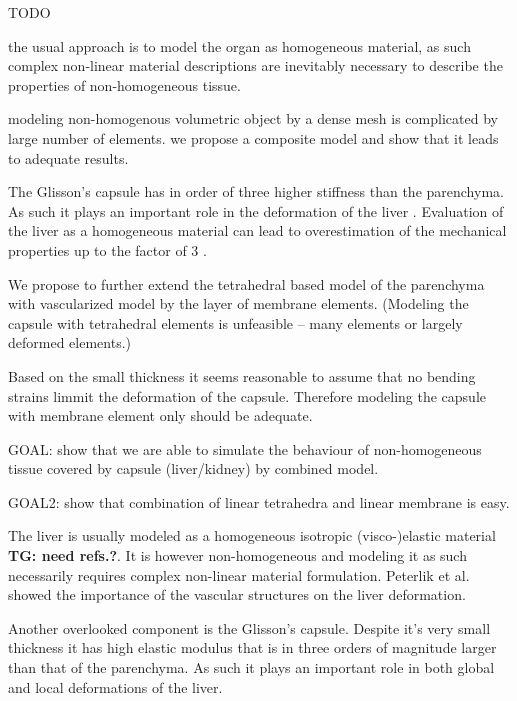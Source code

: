 \documentclass{llncs}
\newcommand{\TG}[1]{{\color{blue}\textbf{TG: #1}}}
\begin{document}
TODO



the usual approach is to model the organ as homogeneous material,
as such complex non-linear material descriptions are inevitably necessary
to describe the properties of non-homogeneous tissue.

modeling non-homogenous volumetric object by a dense mesh is complicated by
large number of elements. we propose a composite model and show that it
leads to adequate results.


The Glisson's capsule has in order of three higher
stiffness than the parenchyma. As such it plays an important role in the
deformation of the liver \cite{Ahn2010,Hollenstein2006}. Evaluation of the
liver as a homogeneous material can lead to overestimation of the
mechanical properties up to the factor of 3 \cite{Hollenstein2006}.


We propose to further extend the tetrahedral based model of the parenchyma
with vascularized model \cite{Peterlik2012} by the layer of membrane elements.
(Modeling the capsule with tetrahedral elements is unfeasible -- many
elements or largely deformed elements.)

Based on the small thickness it seems reasonable to assume that no bending
strains limmit the deformation of the capsule. Therefore modeling the
capsule with membrane element only should be adequate.

GOAL: show that we are able to simulate the behaviour of non-homogeneous
tissue covered by capsule (liver/kidney) by combined model.

GOAL2: show that combination of linear tetrahedra and linear membrane is
easy.


The liver is usually modeled as a homogeneous isotropic (visco-)elastic
material \TG{need refs.?}. It is however non-homogeneous and modeling it as
such necessarily requires complex non-linear material formulation. Peterlik
et al. \cite{Peterlik2012} showed the importance of the vascular structures
on the liver deformation.

Another overlooked component is the Glisson's capsule. Despite it's very
small thickness it has high elastic modulus that is in three orders of
magnitude larger than that of the parenchyma. As such it plays an important
role in both global and local deformations of the liver.
\end{document}
